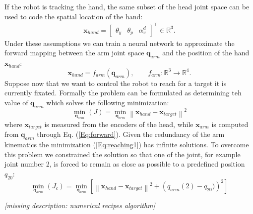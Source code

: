If the robot is tracking the hand, the same subset of the head joint space can be used to code the spatial location of the hand:
%
\begin{eqnarray*}
\mathbf x_{hand}=
\begin{bmatrix} \theta_y & \theta_p & \alpha_v^d\end{bmatrix}^\top \in \mathbb R^3.
\end{eqnarray*}
%
Under these assumptions we can train a neural network to approximate the forward mapping between the arm joint space $\mathbf q_{arm}$ and the position of the hand $\mathbf x_{hand}$:
%
\begin{equation} 
\label{Eq:forward}
\mathbf x_{hand}=f_{arm}(\mathbf q_{arm}), \qquad f_{arm} : \mathbb R^3 \longrightarrow \mathbb R^4.\end{equation}
%
Suppose now that we want to control the robot to reach for a target it is currently 
fixated. Formally the problem can be formulated as determining teh value of $\mathbf q_{arm}$ 
which solves the following minimization:
%
\begin{equation} 
\label{Eq:reaching1}
  \displaystyle\min_{\mathbf q_{arm}}\left(J\right)=\displaystyle\min_{\mathbf q_{arm}}
  \left\|\mathbf x_{hand} - \mathbf x_{target}\right\|^2
\end{equation}
%
where $\mathbf x_{target}$ is measured from the encoders of the head, while 
$\mathbf x_{arm}$ is computed from $\mathbf q_{arm}$ through Eq. (\ref{Eq:forward}). Given the 
redundancy of the arm kinematics the minimization (\ref{Eq:reaching1}) has infinite solutions. To 
overcome this problem we constrained the solution so that one of the joint, for example 
joint number 2, is forced to remain as close as possible to a predefined position $q_{20}$:
%
\begin{equation} 
\label{Eq:reaching2}
  \displaystyle\min_{\mathbf q_{arm}}\left(J_c\right)=\displaystyle\min_{\mathbf q_{arm}}
  \left[
  \left\|\mathbf x_{hand} - \mathbf x_{target}\right\|^2 + \left(q_{arm}(2)-q_{20})\right)^2
  \right]
\end{equation}

\emph{[missing description: numerical recipes algorithm]}

